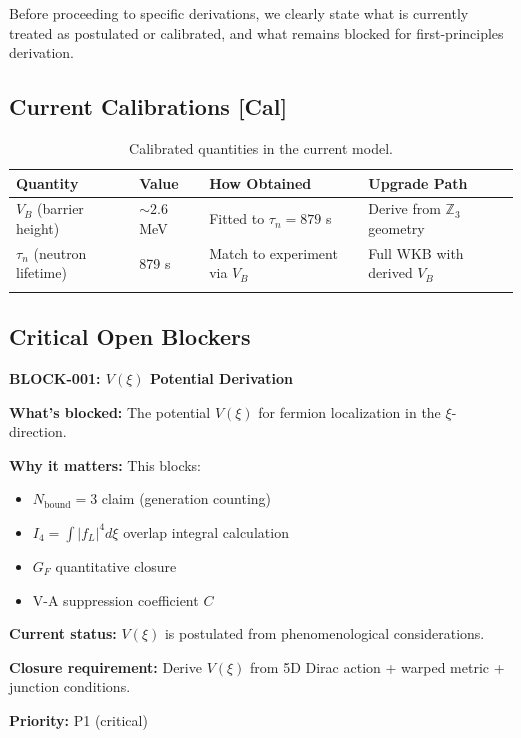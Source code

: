 \documentclass[11pt,a4paper]{article}
\begin{document}
Before proceeding to specific derivations, we clearly state what is currently treated as postulated or calibrated, and what remains blocked for first-principles derivation.

\subsection{Current Calibrations [Cal]}

\begin{longtable}{p{3cm}p{3cm}p{5cm}p{3cm}}
\toprule
\textbf{Quantity} & \textbf{Value} & \textbf{How Obtained} & \textbf{Upgrade Path} \\
\midrule
\endhead
$V_B$ (barrier height) & $\sim 2.6$ MeV & Fitted to $\tau_n = 879$ s & Derive from $\mathbb{Z}_3$ geometry \\
$\tau_n$ (neutron lifetime) & 879 s & Match to experiment via $V_B$ & Full WKB with derived $V_B$ \\
\bottomrule
\caption{Calibrated quantities in the current model.}
\label{tab:calibrations}
\end{longtable}

\subsection{Critical Open Blockers}

\begin{warnbox}
\textbf{BLOCK-001: $V(\xi)$ Potential Derivation}

\textbf{What's blocked:} The potential $V(\xi)$ for fermion localization in the $\xi$-direction.

\textbf{Why it matters:} This blocks:
\begin{itemize}[nosep]
    \item $N_{\text{bound}} = 3$ claim (generation counting)
    \item $I_4 = \int |f_L|^4 d\xi$ overlap integral calculation
    \item $G_F$ quantitative closure
    \item V-A suppression coefficient $C$
\end{itemize}

\textbf{Current status:} $V(\xi)$ is postulated from phenomenological considerations.

\textbf{Closure requirement:} Derive $V(\xi)$ from 5D Dirac action + warped metric + junction conditions.

\textbf{Priority:} P1 (critical)
\end{warnbox}
\end{document}

